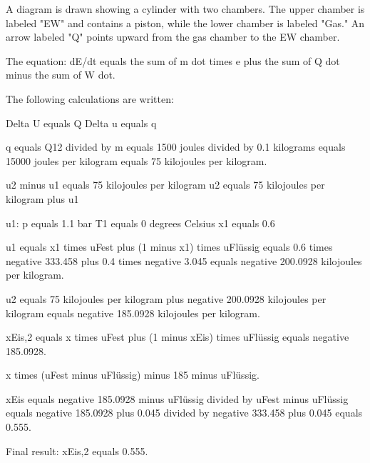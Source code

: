 A diagram is drawn showing a cylinder with two chambers. The upper chamber is labeled "EW" and contains a piston, while the lower chamber is labeled "Gas." An arrow labeled "Q" points upward from the gas chamber to the EW chamber.  

The equation:  
dE/dt equals the sum of m dot times e plus the sum of Q dot minus the sum of W dot.  

The following calculations are written:  

Delta U equals Q  
Delta u equals q  

q equals Q12 divided by m equals 1500 joules divided by 0.1 kilograms equals 15000 joules per kilogram equals 75 kilojoules per kilogram.  

u2 minus u1 equals 75 kilojoules per kilogram  
u2 equals 75 kilojoules per kilogram plus u1  

u1:  
p equals 1.1 bar  
T1 equals 0 degrees Celsius  
x1 equals 0.6  

u1 equals x1 times uFest plus (1 minus x1) times uFlüssig  
equals 0.6 times negative 333.458 plus 0.4 times negative 3.045  
equals negative 200.0928 kilojoules per kilogram.  

u2 equals 75 kilojoules per kilogram plus negative 200.0928 kilojoules per kilogram  
equals negative 185.0928 kilojoules per kilogram.  

xEis,2 equals  
x times uFest plus (1 minus xEis) times uFlüssig equals negative 185.0928.  

x times (uFest minus uFlüssig) minus 185 minus uFlüssig.  

xEis equals negative 185.0928 minus uFlüssig divided by uFest minus uFlüssig  
equals negative 185.0928 plus 0.045 divided by negative 333.458 plus 0.045  
equals 0.555.  

Final result:  
xEis,2 equals 0.555.